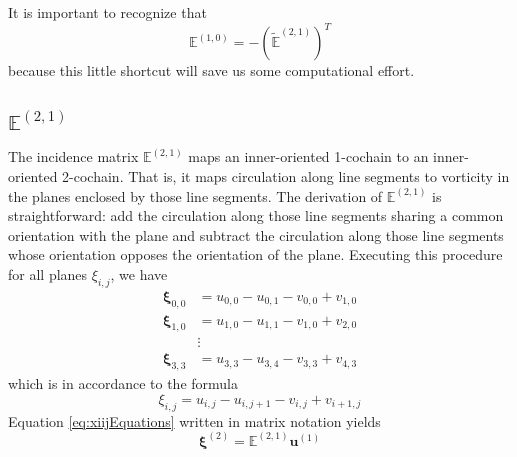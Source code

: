 It is important to recognize that
\begin{equation}
    \mathbb{E}^{(1,0)} = -\left(\tilde{\mathbb{E}}^{(2,1)}\right)^T
\end{equation}
because this little shortcut will save us some computational effort.

\subsection{$\mathbb{E}^{(2,1)}$}

The incidence matrix $\mathbb{E}^{(2,1)}$ maps an inner-oriented 1-cochain to an inner-oriented 2-cochain. That is, it maps circulation along line segments to vorticity in the planes enclosed by those line segments. The derivation of $\mathbb{E}^{(2,1)}$ is straightforward: add the circulation along those line segments sharing a common orientation with the plane and subtract the circulation along those line segments whose orientation opposes the orientation of the plane. Executing this procedure for all planes $\xi_{i,j}$, we have
\begin{equation}
    \begin{split}
        \mathbf{\xi}_{0,0} &= u_{0,0} - u_{0,1} - v_{0,0} + v_{1,0} \\
        \mathbf{\xi}_{1,0} &= u_{1,0} - u_{1,1} - v_{1,0} + v_{2,0} \\
        &\vdots \\
        \mathbf{\xi}_{3,3} &= u_{3,3} - u_{3,4} - v_{3,3} + v_{4,3}
    \end{split}
    \label{eq:xiijEquations}
\end{equation}
which is in accordance to the formula
\begin{equation}
    \xi_{i,j} = u_{i,j} - u_{i,j+1} - v_{i,j} + v_{i+1,j}
\end{equation}
Equation \eqref{eq:xiijEquations} written in matrix notation yields
\begin{equation}
    \mathbf{\xi}^{(2)} = \mathbb{E}^{(2,1)} \mathbf{u}^{(1)}
\end{equation}

